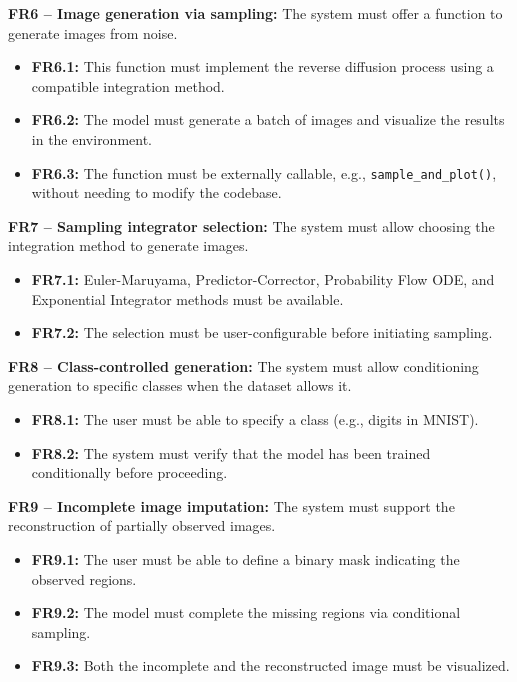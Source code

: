 \documentclass[11pt,a4paper]{article}
\begin{document}
\textbf{FR6 – Image generation via sampling:} The system must offer a function to generate images from noise.
\begin{itemize}
    \item \textbf{FR6.1:} This function must implement the reverse diffusion process using a compatible integration method.
    \item \textbf{FR6.2:} The model must generate a batch of images and visualize the results in the environment.
    \item \textbf{FR6.3:} The function must be externally callable, e.g., \texttt{sample\_and\_plot()}, without needing to modify the codebase.
\end{itemize}

\textbf{FR7 – Sampling integrator selection:} The system must allow choosing the integration method to generate images.
\begin{itemize}
    \item \textbf{FR7.1:} Euler-Maruyama, Predictor-Corrector, Probability Flow ODE, and Exponential Integrator methods must be available.
    \item \textbf{FR7.2:} The selection must be user-configurable before initiating sampling.
\end{itemize}

\textbf{FR8 – Class-controlled generation:} The system must allow conditioning generation to specific classes when the dataset allows it.
\begin{itemize}
    \item \textbf{FR8.1:} The user must be able to specify a class (e.g., digits in MNIST).
    \item \textbf{FR8.2:} The system must verify that the model has been trained conditionally before proceeding.
\end{itemize}

\textbf{FR9 – Incomplete image imputation:} The system must support the reconstruction of partially observed images.
\begin{itemize}
    \item \textbf{FR9.1:} The user must be able to define a binary mask indicating the observed regions.
    \item \textbf{FR9.2:} The model must complete the missing regions via conditional sampling.
    \item \textbf{FR9.3:} Both the incomplete and the reconstructed image must be visualized.
\end{itemize}
\end{document}
